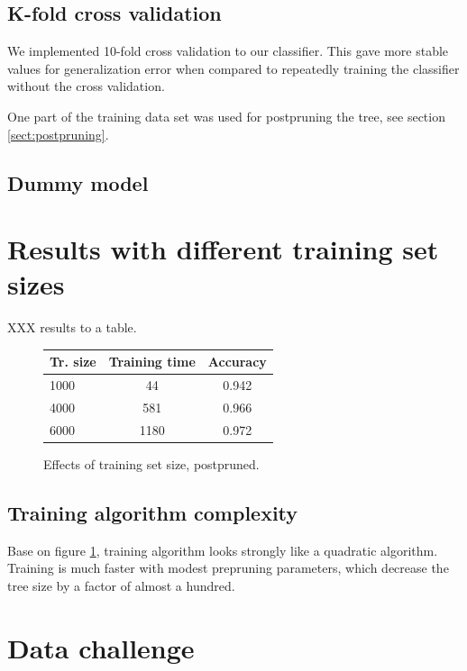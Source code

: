 \documentclass[a4paper,10pt]{article}
\begin{document}
\subsection{K-fold cross validation}

We implemented 10-fold cross validation to our classifier.  This
gave more stable values for generalization error when compared to
repeatedly training the classifier without the cross validation.

One part of the training data set was used for postpruning the tree, see
section \ref{sect:postpruning}.

\subsection{Dummy model}


\section{Results with different training set sizes}

XXX results to a table.
\begin{figure}
  \centering
\begin{tabular}{|l|c|c|}
\hline
Tr. size & Training time & Accuracy \\ \hline
1000 & 44 & 0.942 \\
4000 & 581 & 0.966 \\
6000 & 1180 & 0.972 \\
\hline
\end{tabular}
  \caption{Effects of training set size, postpruned.}
  \label{fig:training-data-size} 
\end{figure}

\subsection{Training algorithm complexity}

Base on figure \ref{fig:training-data-size}, training algorithm looks
strongly like a quadratic algorithm.  Training is much faster with
modest prepruning parameters, which decrease the tree size by a factor
of almost a hundred.

\section{Data challenge}

\end{document}
